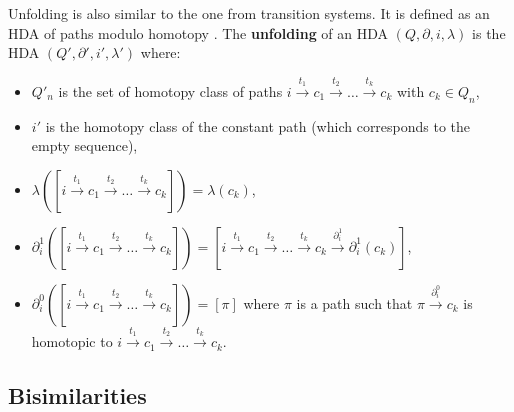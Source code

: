 	Unfolding is also similar to the one from transition systems. It is defined as an HDA of paths modulo homotopy \cite{vanglabbeek91}. The \textbf{unfolding} of an HDA $(Q,\partial, i, \lambda)$ is the HDA $(Q', \partial', i', \lambda')$ where:
	\begin{itemize}
		\item $Q'_n$ is the set of homotopy class of paths $i \xrightarrow{~t_1~} c_1 \xrightarrow{~t_2~} \ldots \xrightarrow{~t_k~} c_k$ with $c_k \in Q_n$,
		\item $i'$ is the homotopy class of the constant path (which corresponds to the empty sequence),
		\item $\lambda([i \xrightarrow{~t_1~} c_1 \xrightarrow{~t_2~} \ldots \xrightarrow{~t_k~} c_k]) = \lambda(c_k)$,
		\item $\partial_i^1([i \xrightarrow{~t_1~} c_1 \xrightarrow{~t_2~} \ldots \xrightarrow{~t_k~} c_k]) = [i \xrightarrow{~t_1~} c_1 \xrightarrow{~t_2~} \ldots \xrightarrow{~t_k~} c_k \xrightarrow{~\partial_i^1~} \partial_i^1(c_k)]$,
		\item $\partial^0_i([i \xrightarrow{~t_1~} c_1 \xrightarrow{~t_2~} \ldots \xrightarrow{~t_k~} c_k]) = [\pi]$ where $\pi$ is a path such that $\pi \xrightarrow{~\partial_i^0~} c_k$ is homotopic to $i \xrightarrow{~t_1~} c_1 \xrightarrow{~t_2~} \ldots \xrightarrow{~t_k~} c_k$.
	\end{itemize}

	
	
	\subsection{Bisimilarities}
	
